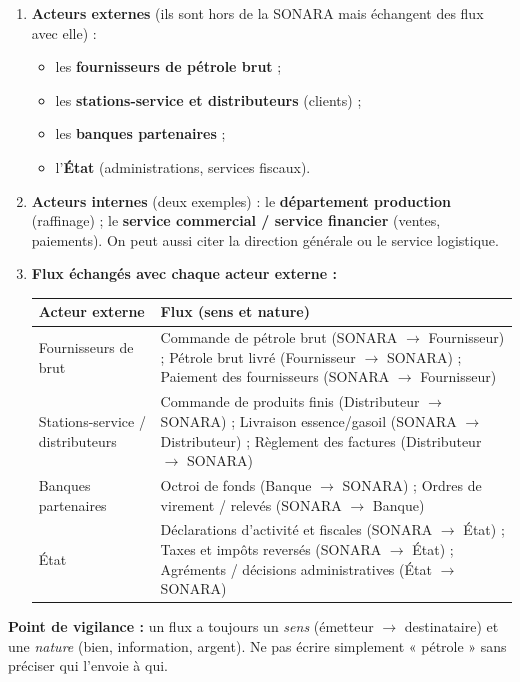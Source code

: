 \documentclass[11pt]{article}
\begin{document}
\begin{corrige}
\begin{enumerate}
\item \textbf{Acteurs externes} (ils sont hors de la SONARA mais échangent des flux avec elle) :
\begin{itemize}
\item les \textbf{fournisseurs de pétrole brut} ;
\item les \textbf{stations-service et distributeurs} (clients) ;
\item les \textbf{banques partenaires} ;
\item l'\textbf{État} (administrations, services fiscaux).
\end{itemize}
\item \textbf{Acteurs internes} (deux exemples) : le \textbf{département production} (raffinage) ; le \textbf{service commercial / service financier} (ventes, paiements). On peut aussi citer la direction générale ou le service logistique.
\item \textbf{Flux échangés avec chaque acteur externe :}
\begin{center}
\begin{tabularx}{\linewidth}{|l|X|}\hline
\rowcolor{popblueL} \textbf{Acteur externe} & \textbf{Flux (sens et nature)} \\\hline
Fournisseurs de brut & Commande de pétrole brut (SONARA $\rightarrow$ Fournisseur) ; Pétrole brut livré (Fournisseur $\rightarrow$ SONARA) ; Paiement des fournisseurs (SONARA $\rightarrow$ Fournisseur) \\\hline
Stations-service / distributeurs & Commande de produits finis (Distributeur $\rightarrow$ SONARA) ; Livraison essence/gasoil (SONARA $\rightarrow$ Distributeur) ; Règlement des factures (Distributeur $\rightarrow$ SONARA) \\\hline
Banques partenaires & Octroi de fonds (Banque $\rightarrow$ SONARA) ; Ordres de virement / relevés (SONARA $\rightarrow$ Banque) \\\hline
État & Déclarations d'activité et fiscales (SONARA $\rightarrow$ État) ; Taxes et impôts reversés (SONARA $\rightarrow$ État) ; Agréments / décisions administratives (État $\rightarrow$ SONARA) \\\hline
\end{tabularx}
\end{center}
\end{enumerate}
\textbf{Point de vigilance :} un flux a toujours un \emph{sens} (émetteur $\rightarrow$ destinataire) et une \emph{nature} (bien, information, argent). Ne pas écrire simplement « pétrole » sans préciser qui l'envoie à qui.
\end{corrige}
\end{document}

